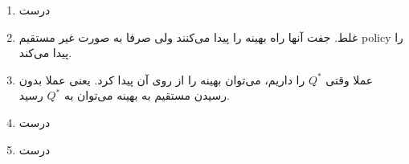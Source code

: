 \begin{enumerate}
    \item درست
    \item غلط. جفت آنها راه بهینه را پیدا می‌کنند ولی صرفا  به صورت غیر مستقیم policy را پیدا می‌کند.
    \item عملا وقتی $Q^*$ را داریم،‌ می‌توان  بهینه را از روی آن پیدا کرد. یعنی عملا بدون رسیدن مستقیم به  بهینه می‌توان به  $Q^*$ رسید.
    \item درست
    \item درست
\end{enumerate}
